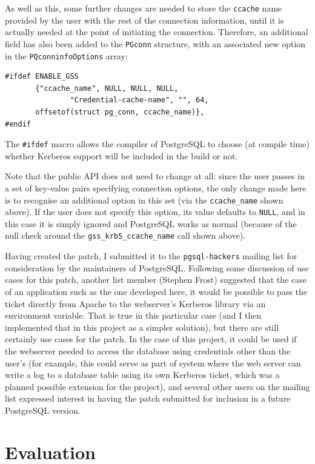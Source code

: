 \documentclass{report}
\begin{document}
As well as this, some further changes are needed to store the \texttt{ccache} name provided by the user with the rest of the connection information, until it is actually needed at the point of initiating the connection. Therefore, an additional field has also been added to the \texttt{PGconn} structure, with an associated new option in the \texttt{PQconninfoOptions} array:

\begin{verbatim}
#ifdef ENABLE_GSS
       {"ccache_name", NULL, NULL, NULL,
               "Credential-cache-name", "", 64,
       offsetof(struct pg_conn, ccache_name)},
#endif
\end{verbatim}

The \verb+#ifdef+ macro allows the compiler of PostgreSQL to choose (at compile time) whether Kerberos support will be included in the build or not.

Note that the public API does not need to change at all: since the user passes in a set of key-value pairs specifying connection options, the only change made here is to recognise an additional option in this set (via the \verb+ccache_name+ shown above). If the user does not specify this option, its value defaults to \texttt{NULL}, and in this case it is simply ignored and PostgreSQL works as normal (because of the null check around the \verb+gss_krb5_ccache_name+ call shown above).

Having created the patch, I submitted it to the \texttt{pgsql-hackers} mailing list for consideration by the maintainers of PostgreSQL\cite{postgres-patch-list}. Following some discussion of use cases for this patch, another list member (Stephen Frost) suggested that the case of an application such as the one developed here, it would be possible to pass the ticket directly from Apache to the webserver's Kerberos library via an environment variable. That is true in this particular case (and I then implemented that in this project as a simpler solution), but there are still certainly use cases for the patch. In the case of this project, it could be used if the webserver needed to access the database using credentials other than the user's (for example, this could serve as part of system where the web server can write a log to a database table using its own Kerberos ticket, which was a planned possible extension for the project), and several other users on the mailing list expressed interest in having the patch submitted for inclusion in a future PostgreSQL version.


\chapter{Evaluation}
\end{document}
